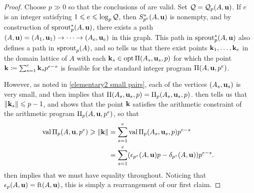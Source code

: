 \documentclass[11pt]{amsart}
\begin{document}
\begin{proof}
   Choose $p \gg 0$ so that the conclusions of  are valid.
   Set $\mathcal{Q} = \mathcal{Q}_p(A,\mathbf{u})$.
   If $e$ is an integer satisfying $1 \leqslant e \leqslant \log_p\mathcal{Q}$, then $S_{p^e}^{\ast}(A,\mathbf{u})$ is nonempty, and by construction of $\operatorname{sprout}_p^{\ast}(A,\mathbf{u})$, there exists a path $(A,\mathbf{u}) = (A_1, \mathbf{u}_1) \to \cdots \to (A_e, \mathbf{u}_e)$ in this graph.
   This path in $\operatorname{sprout}_p^{\ast}(A,\mathbf{u})$ also defines a path in $\operatorname{sprout}_p(A)$, and so  tells us that there exist points $\mathbf{k}_1,\ldots,\mathbf{k}_e$ in the domain lattice of $A$ with each $\mathbf{k}_s \in \operatorname{opt} \Pi(A_s, \mathbf{u}_s, p)$ for which the point $\mathbf{k} \coloneqq \sum_{s=1}^e \mathbf{k}_s p^{e-s}$ is feasible for the standard integer program $\Pi(A, \mathbf{u}, p^e)$.

   However, as noted in \eqref{elementary2 small pairs}, each of the vertices $(A_s, \mathbf{u}_s)$ is very small, and   then implies that $\Pi(A_s,\mathbf{u}_s,p) = \Pi_p(A_s, \mathbf{u}_s, p)$.
    then tells us that $\| \mathbf{k}_s \| \leqslant p - 1$, and  shows that the point $\mathbf{k}$ satisfies the arithmetic constraint of the arithmetic program $\Pi_p(A,\mathbf{u},p^e)$, so that
   \begin{align*}
     \operatorname{val} \Pi_p(A,\mathbf{u},p^e) \geqslant  \| \mathbf{k} \| & = \sum_{s=1}^e \operatorname{val} \Pi_p(A_s,\mathbf{u}_s,p) p^{e-s} \\
                                                  & = \sum_{s=1}^e (\epsilon_{p^s}(A,\mathbf{u})p - \delta_{p^s}(A,\mathbf{u})) p^{e-s}.
   \end{align*}
    then implies that we must have equality throughout.
   Noticing that $\epsilon_p(A,\mathbf{u}) = \operatorname{ft}(A, \mathbf{u})$, this is simply a rearrangement of our first claim.


\end{proof}
\end{document}
